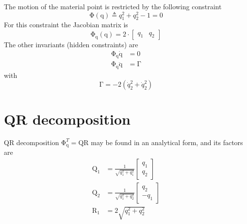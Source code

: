 \documentclass{scrartcl}
\newcommand\mMat[1]{\ensuremath{\boldsymbol{\mathrm{#1}}}}
\newcommand\mVec[1]{\ensuremath{\boldsymbol{\mathrm{#1}}}}
\newcommand\mOf[1]{\left({#1}\right)}
\begin{document}
The motion of the material point is restricted by the following constraint
\begin{equation}
  \mMat{\Phi}\mOf{\mVec{q}} \triangleq q_1^2 + q_2^2 - 1 = 0
  \label{eq:90ZU7}
\end{equation}
For this constraint the Jacobian matrix is
\begin{equation}
  \mMat{\Phi}_{\mVec{q}}\mOf{\mVec{q}} = 2 \cdot \begin{bmatrix}
    q_1 & q_2
  \end{bmatrix}
  \label{eq:5L0HL}
\end{equation}
The other invariants (hidden constraints) are
\begin{subequations}
\label{eq:IQT3I}
\begin{align}
  \mMat{\Phi}_{\mVec{q}}\mVec{\dot q} &= \mVec{0}
  \\
  \mMat{\Phi}_{\mVec{q}}\mVec{\ddot q} &= \mVec{\Gamma}
\end{align}
\end{subequations}
with
\begin{equation}
  \mVec{\Gamma} = - 2 \left( {\dot q}_2^2 + {\dot q}_2^2 \right)
\end{equation}

\section{QR decomposition}

QR decomposition $\mMat{\Phi}_{\mVec{q}}^T = \mMat{Q} \mMat{R}$ may be found in
an analytical form, and its factors are
\begin{subequations}
\begin{align}
  \mMat{Q}_1 & = \frac{1}{\sqrt{q_1^2 + q_1^2}} \begin{bmatrix}
    q_1 \\ q_2
  \end{bmatrix}
  \\
  \mMat{Q}_2 & = \frac{1}{\sqrt{q_1^2 + q_2^2}} \begin{bmatrix}
    q_2 \\ -q_1
  \end{bmatrix}
  \\
  \mMat{R}_1 & = 2 \sqrt{q_1^2 + q_2^2}
\end{align}
\end{subequations}
\end{document}
